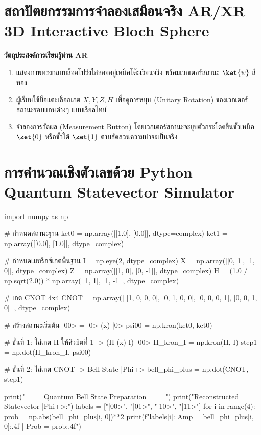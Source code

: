 \section{สถาปัตยกรรมการจำลองเสมือนจริง AR/XR 3D Interactive Bloch Sphere}

\begin{arbox}
\textbf{วัตถุประสงค์การเรียนรู้ผ่าน AR}
\begin{enumerate}
    \item แสดงภาพทรงกลมบล็อคโปร่งใสลอยอยู่เหนือโต๊ะเรียนจริง พร้อมเวกเตอร์สถานะ $\ket{\psi}$ สีทอง
    \item ผู้เรียนใช้มือแตะเลือกเกต $X, Y, Z, H$ เพื่อดูการหมุน (Unitary Rotation) ของเวกเตอร์สถานะรอบแกนต่างๆ แบบเรียลไทม์
    \item จำลองการวัดผล (Measurement Button) โดยเวกเตอร์สถานะจะยุบตัวกระโดดขึ้นขั้วเหนือ $\ket{0}$ หรือขั้วใต้ $\ket{1}$ ตามสัดส่วนความน่าจะเป็นจริง
\end{enumerate}
\end{arbox}

\section{การคำนวณเชิงตัวเลขด้วย Python Quantum Statevector Simulator}

\begin{pythonbox}
import numpy as np

# กำหนดสถานะฐาน
ket0 = np.array([[1.0], [0.0]], dtype=complex)
ket1 = np.array([[0.0], [1.0]], dtype=complex)

# กำหนดเมทริกซ์เกตพื้นฐาน
I = np.eye(2, dtype=complex)
X = np.array([[0, 1], [1, 0]], dtype=complex)
Z = np.array([[1, 0], [0, -1]], dtype=complex)
H = (1.0 / np.sqrt(2.0)) * np.array([[1, 1], [1, -1]], dtype=complex)

# เกต CNOT 4x4
CNOT = np.array([
    [1, 0, 0, 0],
    [0, 1, 0, 0],
    [0, 0, 0, 1],
    [0, 0, 1, 0]
], dtype=complex)

# สร้างสถานะเริ่มต้น |00> = |0> (x) |0>
psi00 = np.kron(ket0, ket0)

# ขั้นที่ 1: ใส่เกต H ให้คิวบิตที่ 1 -> (H (x) I) |00>
H_kron_I = np.kron(H, I)
step1 = np.dot(H_kron_I, psi00)

# ขั้นที่ 2: ใส่เกต CNOT -> Bell State |Phi+>
bell_phi_plus = np.dot(CNOT, step1)

print("=== Quantum Bell State Preparation ===")
print("Reconstructed Statevector |Phi+>:")
labels = ["|00>", "|01>", "|10>", "|11>"]
for i in range(4):
    prob = np.abs(bell_phi_plus[i, 0])**2
    print(f"{labels[i]}: Amp = {bell_phi_plus[i, 0]:.4f} | Prob = {prob:.4f}")
\end{pythonbox}

